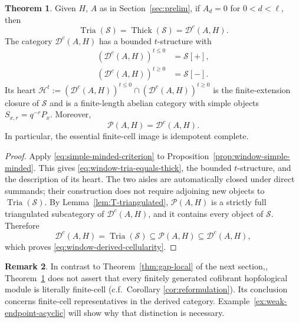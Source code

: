\documentclass[11pt]{article}
\theoremstyle{definition}
\newtheorem{thm}{Theorem}[section]
\newtheorem{rem}[thm]{Remark}
\numberwithin{equation}{section}
\newcommand{\kk}{\Bbbk}
\newcommand{\Tcat}{\mathcal{P}(A,H)}
\newcommand{\Dc}{\mathcal{D}^c(A,H)}
\newcommand{\tria}{\operatorname{Tria}}
\newcommand{\thick}{\operatorname{Thick}}
\begin{document}
\begin{thm}
\label{thm:window-tstructure}
Given $H$, $A$ as in Section~\ref{sec:prelim}, if $A_d=0$ for $0<d<\ell$, then
\begin{equation}\label{eq:window-tria-equals-thick}
 \tria(\mathcal S)=\thick(\mathcal S)=\Dc.
\end{equation}
The category $\Dc$ has a bounded $t$-structure with
\begin{equation}\label{eq:window-t-aisles}
 \begin{aligned}
 (\Dc)^{t\le0}&=\mathcal{S}[+],\\
 (\Dc)^{t\ge0}&=\mathcal{S}[-].
 \end{aligned}
\end{equation}
Its heart $\mathcal{H}^t:= (\Dc)^{t\le 0} \cap (\Dc)^{t\ge 0}$ is the finite-extension closure of
$\mathcal S$ and is a finite-length abelian category with simple
objects $S_{x,r}=q^{-r}P_x$.
Moreover,
\begin{equation}\label{eq:window-derived-cellularity}
 \Tcat=\Dc.
\end{equation}
In particular, the essential finite-cell image is idempotent complete.
\end{thm}
\begin{proof}
Apply \eqref{eq:simple-minded-criterion} to
Proposition~\ref{prop:window-simple-minded}.  This gives
\eqref{eq:window-tria-equals-thick}, the bounded $t$-structure, and
the description of its heart.  The two aisles are automatically
closed under direct summands; their construction does not require
adjoining new objects to $\tria(\mathcal S)$.
By Lemma~\ref{lem:T-triangulated}, $\Tcat$ is a strictly full
triangulated subcategory of $\Dc$, and it contains every object of
$\mathcal S$.  Therefore
\[
 \Dc=\tria(\mathcal S)\subseteq\Tcat\subseteq\Dc,
\]
which proves \eqref{eq:window-derived-cellularity}.
\end{proof}

\begin{rem}
\label{rem:window-scope}
In contrast to Theorem~\ref{thm:gap-local} of the next section,, Theorem~\ref{thm:window-tstructure} does not assert that every finitely generated
cofibrant hopfological module is literally finite-cell (c.f.~Corollary \ref{cor:reformulation}).
Its conclusion concerns finite-cell representatives in the derived
category.  Example~\ref{ex:weak-endpoint-acyclic} will show why that
distinction is necessary. 
\end{rem}
\end{document}
